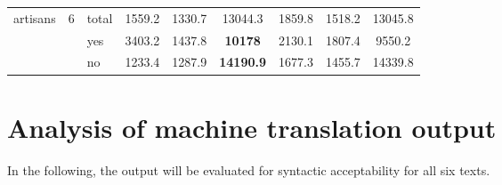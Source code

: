 {\begin{longtable}{@{ }p{2.2cm}@{ }l@{ }l@{}*{6}{S[table-format=5.1]}@{}}
\tablevspace
{  artisans} &  6 &  total &  1559.2 &  1330.7 &  13044.3 &  1859.8 &  1518.2 &  13045.8\\
&  &  yes &  3403.2 &  1437.8 & \bfseries 10178 &  2130.1 &  1807.4 &  9550.2\\
 &  &  no &  1233.4 &  1287.9 & \bfseries 14190.9 &  1677.3 &  1455.7 &  14339.8\\
\end{longtable}}



\chapter{Analysis of machine translation output}
\label{sec:Appendix:C}
In the following, the  output will be evaluated for syntactic acceptability for all six texts.\largerpage[2]

